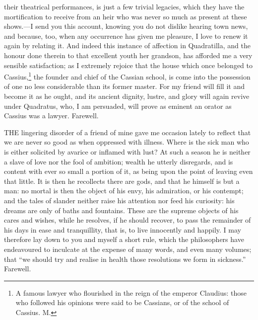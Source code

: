 their theatrical performances, is just a few trivial legacies, which they
have the mortification to receive from an heir who was never so much as
present at these shows.—I send you this account, knowing you do not
dislike hearing town news, and because, too, when any occurrence has given
me pleasure, I love to renew it again by relating it. And indeed this
instance of affection in Quadratilla, and the honour done therein to that
excellent youth her grandson, has afforded me a very sensible
satisfaction; as I extremely rejoice that the house which once belonged to
Cassius,\footnote{A famous lawyer who
flourished in the reign of the emperor Claudius: those who followed his
opinions were said to be Cassians, or of the school of Cassius. M.}
the founder and chief of the Cassian school, is come into the possession
of one no less considerable than its former master. For my friend will
fill it and become it as he ought, and its ancient dignity, lustre, and
glory will again revive under Quadratus, who, I am persuaded, will prove
as eminent an orator as Cassius was a lawyer. Farewell.


THE lingering disorder of a friend of mine gave me occasion lately to
reflect that we are never so good as when oppressed with illness. Where is
the sick man who is either solicited by avarice or inflamed with lust? At
such a season he is neither a slave of love nor the fool of ambition;
wealth he utterly disregards, and is content with ever so small a portion
of it, as being upon the point of leaving even that little. It is then he
recollects there are gods, and that he himself is but a man: no mortal is
then the object of his envy, his admiration, or his contempt; and the
tales of slander neither raise his attention nor feed his curiosity: his
dreams are only of baths and fountains. These are the supreme objects of
his cares and wishes, while he resolves, if he should recover, to pass the
remainder of his days in ease and tranquillity, that is, to live
innocently and happily. I may therefore lay down to you and myself a short
rule, which the philosophers have endeavoured to inculcate at the expense
of many words, and even many volumes; that ``we should try and realise in
health those resolutions we form in sickness.'' Farewell.


